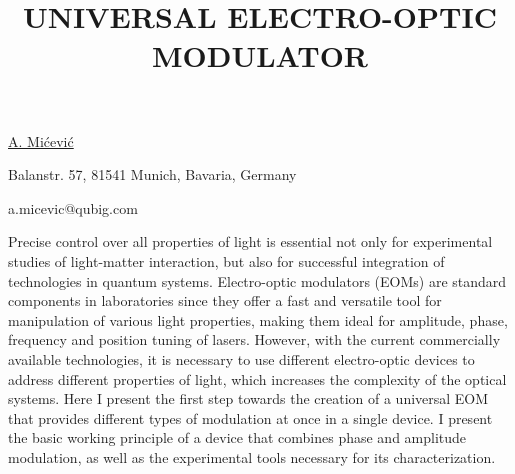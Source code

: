 \title{UNIVERSAL ELECTRO-OPTIC MODULATOR}

\underline{A. Mićević}  

{\normalsize{\vspace{-4mm}
Balanstr. 57, 81541 Munich,
Bavaria, Germany



\email a.micevic@qubig.com}}

Precise control over all properties of light is essential not only for experimental studies of light-matter interaction, but also for successful integration of technologies in quantum systems. Electro-optic modulators (EOMs) are standard components in laboratories since they offer a fast and versatile tool for manipulation of various light properties, making them ideal for amplitude, phase, frequency and position tuning of lasers. However, with the current commercially available technologies, it is necessary to use different electro-optic devices to address different properties of light, which increases the complexity of the optical systems. Here I present the first step towards the creation of a universal EOM that provides different types of modulation at once in a single device. I present the basic working principle of a device that combines phase and amplitude modulation, as well as the experimental tools necessary for its characterization. 

\vspace{\baselineskip}